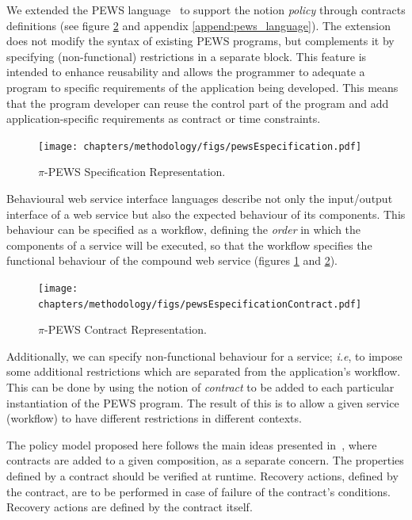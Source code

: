  We extended the PEWS language~\cite{Placido2010LTPD} to support the notion
\textit{policy} through contracts definitions (see figure
\ref{fig:contractRepresentation} and appendix \ref{append:pews_language}). The
extension does not modify the syntax of existing PEWS programs, but complements
it by specifying (non-functional) restrictions in a separate block. This feature
is intended to enhance reusability and allows the programmer to adequate a
program to specific requirements of the application being developed. This means
that the program developer can reuse the control part of the program and add
application-specific requirements as contract or time constraints.

 \begin{figure}[ht!]
\centering
\texttt{[image: chapters/methodology/figs/pewsEspecification.pdf]}
\caption{$\pi$-PEWS Specification Representation.}
\label{fig:pewsRepresentation}
\end{figure}

 Behavioural web service interface languages describe not only the input/output
interface of a web service but also the expected behaviour of its components.
This behaviour can be specified as a workflow, defining the \textit{order} in
which the components of a service will be executed, so that the workflow
specifies the functional behaviour of the compound web service (figures \ref{fig:pewsRepresentation} and
\ref{fig:contractRepresentation}). 




\begin{figure}[ht!] 
\centering
\texttt{[image: chapters/methodology/figs/pewsEspecificationContract.pdf]}
\caption{$\pi$-PEWS Contract Representation.}
\label{fig:contractRepresentation}
\end{figure}

Additionally, we can specify non-functional behaviour for a service;
\textit{i.e}, to impose some additional restrictions which are separated from 
the application's workflow. This can be done by
using the notion of \textit{contract} to be added to each particular instantiation of
the PEWS program. The result of this is to allow a given service (workflow) to
have different restrictions in different contexts.



The policy model proposed here follows the main ideas presented
in~\cite{Espinosa-OviedoVZC09,PortillaHE08}, where contracts are added to a
given composition, as a separate concern. The properties defined by a contract
should be verified at runtime. Recovery actions, defined by the contract, are to
be performed in case of failure of the contract's conditions. Recovery actions
are defined by the contract itself.


